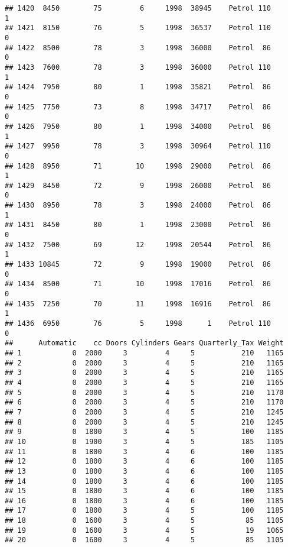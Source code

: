 \documentclass[]{article}
\begin{document}
\begin{verbatim}
## 1420  8450        75         6     1998  38945    Petrol 110         1
## 1421  8150        76         5     1998  36537    Petrol 110         0
## 1422  8500        78         3     1998  36000    Petrol  86         0
## 1423  7600        78         3     1998  36000    Petrol 110         1
## 1424  7950        80         1     1998  35821    Petrol  86         0
## 1425  7750        73         8     1998  34717    Petrol  86         0
## 1426  7950        80         1     1998  34000    Petrol  86         1
## 1427  9950        78         3     1998  30964    Petrol 110         0
## 1428  8950        71        10     1998  29000    Petrol  86         1
## 1429  8450        72         9     1998  26000    Petrol  86         0
## 1430  8950        78         3     1998  24000    Petrol  86         1
## 1431  8450        80         1     1998  23000    Petrol  86         0
## 1432  7500        69        12     1998  20544    Petrol  86         1
## 1433 10845        72         9     1998  19000    Petrol  86         0
## 1434  8500        71        10     1998  17016    Petrol  86         0
## 1435  7250        70        11     1998  16916    Petrol  86         1
## 1436  6950        76         5     1998      1    Petrol 110         0
##      Automatic    cc Doors Cylinders Gears Quarterly_Tax Weight
## 1            0  2000     3         4     5           210   1165
## 2            0  2000     3         4     5           210   1165
## 3            0  2000     3         4     5           210   1165
## 4            0  2000     3         4     5           210   1165
## 5            0  2000     3         4     5           210   1170
## 6            0  2000     3         4     5           210   1170
## 7            0  2000     3         4     5           210   1245
## 8            0  2000     3         4     5           210   1245
## 9            0  1800     3         4     5           100   1185
## 10           0  1900     3         4     5           185   1105
## 11           0  1800     3         4     6           100   1185
## 12           0  1800     3         4     6           100   1185
## 13           0  1800     3         4     6           100   1185
## 14           0  1800     3         4     6           100   1185
## 15           0  1800     3         4     6           100   1185
## 16           0  1800     3         4     6           100   1185
## 17           0  1800     3         4     5           100   1185
## 18           0  1600     3         4     5            85   1105
## 19           0  1600     3         4     5            19   1065
## 20           0  1600     3         4     5            85   1105

\end{verbatim}
\end{document}

